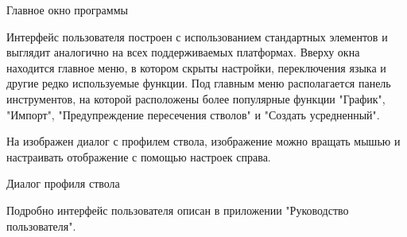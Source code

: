  {
  Главное окно программы
}

Интерфейс пользователя построен с использованием стандартных элементов и выглядит аналогично на всех поддерживаемых платформах. Вверху окна находится
главное меню, в котором скрыты настройки, переключения языка и другие редко используемые функции. Под главным меню располагается панель инструментов,
на которой расположены более популярные функции "График", "Импорт", "Предупреждение пересечения стволов" и "Создать усредненный".

На  изображен диалог с профилем ствола, изображение можно вращать мышью и настраивать отображение с помощью настроек справа.

 {
  Диалог профиля ствола
}

Подробно интерфейс пользователя описан в приложении "Руководство пользователя".
